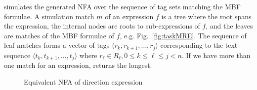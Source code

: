 \framework simulates the generated NFA over the sequence of tag sets matching the MBF formulae.
A simulation match $m$ of an expression $f$ is a tree where the root spans the expression, the internal nodes are roots to sub-expressions of $f$, and the leaves are matches of the MBF formulae of $f$, e.g. Fig.~\ref{fig:taskMRE}.
The sequence of leaf matches forms a vector of tags $\langle r_k,r_{k+1},\dots,r_j\rangle$ 
corresponding to the text sequence 
$\langle t_k,t_{k+1},\dots,t_j\rangle$ where $r_{\ell}\in R_{\ell},0\le k\le \ell \le j < n$.
%
%
If we have more than one match for an expression, 
\framework returns the longest.


\setarab
\transfalse

\begin{figure}[tb!]
\centering
{}
  \caption{Equivalent NFA of direction expression}
  \label{fig:nfaEx}
\end{figure}
\transtrue
{}

